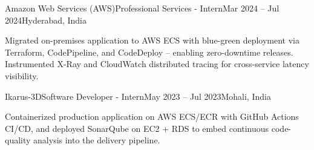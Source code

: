 \resumeExp
{Amazon Web Services (AWS)}{Professional Services - Intern}{Mar 2024 -- Jul 2024}{Hyderabad, India}
\resumeItemListStart
    \item[$\diamond$] Migrated on-premises application to AWS ECS with blue-green deployment via Terraform, CodePipeline, and CodeDeploy -- enabling zero-downtime releases. Instrumented X-Ray and CloudWatch distributed tracing for cross-service latency visibility.
\resumeItemListEnd

\resumeExp
{Ikarus-3D}{Software Developer - Intern}{May 2023 -- Jul 2023}{Mohali, India}
\resumeItemListStart
    \item[$\diamond$] Containerized production application on AWS ECS/ECR with GitHub Actions CI/CD, and deployed SonarQube on EC2 + RDS to embed continuous code-quality analysis into the delivery pipeline.
\resumeItemListEnd

\resumeSubHeadingListEnd
